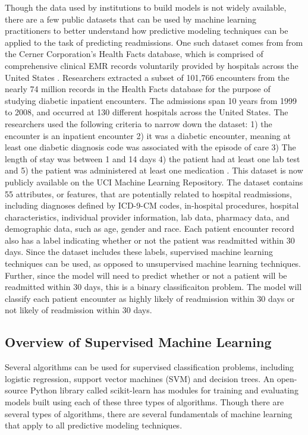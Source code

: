 \documentclass[sigconf]{acmart}
\begin{document}
Though the data used by institutions to build models is not widely available, there are a few public  datasets that can be used by machine learning practitioners to better understand how predictive modeling techniques can be applied to the task of predicting readmissions. One such dataset comes from from the Cerner Corporation's Health Facts database, which is comprised of comprehensive clinical EMR records voluntarily provided by hospitals across the United States \cite{cite11}.
Researchers extracted a subset of 101,766 encounters from the nearly 74 million records in the Health Facts database for the purpose of studying diabetic inpatient encounters. The admissions span 10 years from 1999 to 2008, and occurred at 130 different hospitals across the United States. The researchers used the following criteria to narrow down the dataset: 1) the encounter is an inpatient encounter 2) it was a diabetic encounter, meaning at least one diabetic diagnosis code was associated with the episode of care 3) The length of stay was between 1 and 14 days 4) the patient had at least one lab test and 5) the patient was administered at least one medication \cite{cite11}. This dataset is now publicly available on the UCI Machine Learning Repository.
The dataset contains 55 attributes, or features, that are potentially related to hospital readmissions, including diagnoses defined by ICD-9-CM codes, in-hospital procedures, hospital characteristics, individual provider information, lab data, pharmacy data, and demographic data, such as age, gender and race. Each patient encounter record also has a label indicating whether or not the patient was readmitted within 30 days. Since the dataset includes these labels, supervised machine learning techniques can be used, as opposed to unsupervised machine learning techniques. Further, since the model will need to predict whether or not a patient will be readmitted within 30 days, this is a binary classificaiton problem. The model will classify each patient encounter as highly likely of readmission within 30 days or not likely of readmission within 30 days.

\subsection{Overview of Supervised Machine Learning}

Several algorithms can be used for supervised classification problems, including logistic regression, support vector machines (SVM) and decision trees. An open-source Python library called scikit-learn has modules for training and evaluating models built using each of these three types of algorithms. Though there are several types of algorithms, there are several fundamentals of machine learning that apply to all predictive modeling techniques.
\end{document}
